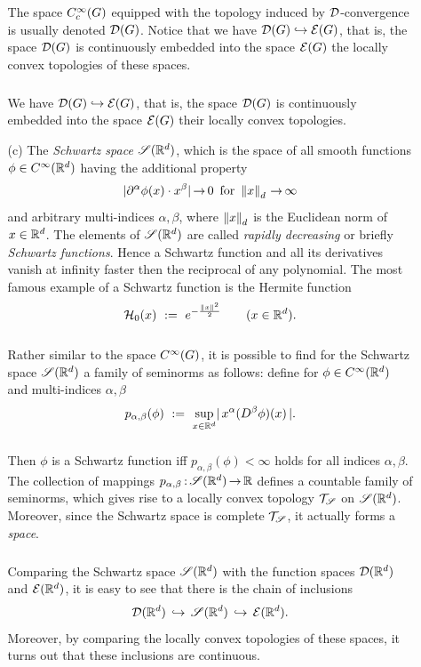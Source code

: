 \documentclass[11pt,twoside]{article}
\begin{document}
\begin{itemize}[leftmargin=15pt,itemsep=6pt]
\begin{itemize}[leftmargin=20pt]
The space $\TF$ equipped with the topology
induced by $\D$-convergence is usually denoted $\D(\G)$.
Notice
that we have $\D(\G) \hookrightarrow \E(\G)$,
that is,
the space $\D(\G)$ is continuously embedded into the space $\E(\G)$
{\wrt} the locally convex topologies of these spaces.

\subparagraph*{}
We have $\D(\G) \hookrightarrow \E(\G)$,
that is,
the space $\D(\G)$ is continuously embedded into the space $\E(\G)$
{\wrt} their locally convex topologies.

\item[(c)]
The \textit{Schwartz space} $\mathscr{S}({\mathbb{R}}^d)$,
which is the space of all smooth functions $\phi \in C^{\infty}({\mathbb{R}}^d)$
having the additional property
\[
\abs{ \PA \phi(x) \cdot x^{\beta}} \xto 0 \,
\for \norm{x}_d \xto \infty
\]
and arbitrary multi-indices $\alpha,\beta$,
where $\left\lVert x \right\rVert_d$ is the Euclidean norm of $x \in {\mathbb{R}}^d$.
The elements of $\mathscr{S}({\mathbb{R}}^d)$ are called \textit{rapidly decreasing}
or briefly \textit{Schwartz functions}.
Hence a Schwartz function and all its derivatives vanish at infinity
faster then the reciprocal of any polynomial.
The most famous example of a Schwartz function is the Hermite function
\[
{\mathcal{H}}_0(x) \, \,:=\, \, e^{- \frac{\left\lVert x \right\rVert^2}{2}} \quad \quad (x \in {\mathbb{R}}^d).
\]

\subparagraph*{}
Rather similar to the space $C^{\infty}(G)$,
it is possible to find for the Schwartz space $\mathscr{S}({\mathbb{R}}^d)$
a family of seminorms as follows:
define for $\phi \in C^{\infty}({\mathbb{R}}^d)$ and multi-indices $\alpha, \beta$
\begin{equation}\label{I_SRN_FAMILY_OF_SEMINORMS}
p_{\alpha,\beta}(\phi) \, \eqdef \,
\sup_{x \in \Rd} \abs{ \, x^{\alpha} (D^{\beta} \phi) (x) \, } .
\end{equation}

\subparagraph*{}
Then $\phi$ is a Schwartz function
iff $p_{\alpha,\beta}(\phi) < \infty$
holds for all indices $\alpha, \beta$.
The collection of mappings $p_{\alpha,\beta}{\,:\,}\mathscr{S}({\mathbb{R}}^d) {\,\to\,} {\mathbb{R}}$
defines a countable family of seminorms,
which gives rise to a locally convex topology $\mathcal{T}_{\mathscr{S}}$ on $\mathscr{S}({\mathbb{R}}^d)$.
Moreover,
since the Schwartz space is complete {\wrt} $\mathcal{T}_{\mathscr{S}}$,
it actually forms a \textit{{\FRECHET} space}.

\subparagraph*{}
Comparing the Schwartz space $\mathscr{S}({\mathbb{R}}^d)$ with the function spaces
${\mathcal{D}}({\mathbb{R}}^d)$ and ${\mathcal{E}}({\mathbb{R}}^d)$,
it is easy to see that there is the chain of inclusions
\[
{\mathcal{D}}({\mathbb{R}}^d) \, \hookrightarrow \, \mathscr{S}({\mathbb{R}}^d) \, \hookrightarrow \, {\mathcal{E}}({\mathbb{R}}^d).
\]
Moreover,
by comparing the locally convex topologies of these spaces,
it turns out that these inclusions are continuous.
\end{itemize}


\end{itemize}
\end{document}
